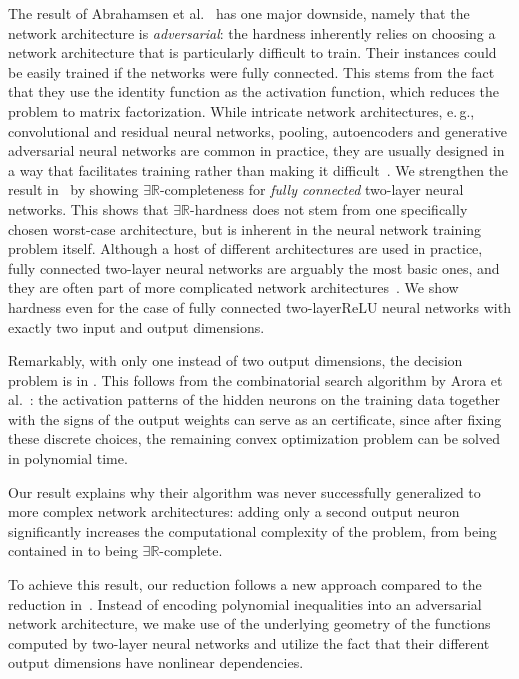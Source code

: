 \documentclass[11pt]{article}
\numberwithin{equation}{section}
\theoremstyle{definition}
\theoremstyle{plain}
\newcommand{\R}{\mathbb R}
\newcommand{\eg}{e.\,g.}
\newcommand{\ER}{\texorpdfstring{\ensuremath{\exists\R}}{ER}\xspace}
\newcommand{\fullyconnected}{fully connected\xspace}
\newcommand{\twolayer}{two-layer\xspace}
\newcommand{\ReLU}{\ensuremath{\mathrm{ReLU}}\xspace}
\theoremstyle{plain}
\begin{document}
The result of Abrahamsen et al.~\cite{Abrahamsen2021_NeuralNetworks} has one major
downside, namely that the network architecture is \emph{adversarial}:
%
the  %
hardness inherently relies on choosing a network architecture that is particularly
difficult to train.
Their instances could be easily trained if the networks were \fullyconnected.
This stems from the fact that they use the identity function as the activation function,
which reduces the problem to matrix factorization.
While intricate network architectures, \eg, convolutional and residual neural networks, pooling, autoencoders and generative adversarial neural networks are common in practice, they are usually designed in a way that facilitates training rather than making it difficult~\cite{Goodfellow2016_DeepLearning}.
We strengthen the result in~\cite{Abrahamsen2021_NeuralNetworks} by showing \ER-completeness for \emph{\fullyconnected} \twolayer neural networks.
This shows that \ER-hardness does not stem from one specifically chosen worst-case architecture, but is inherent in the neural network training problem itself.
Although a host of different architectures are used in practice, \fullyconnected \twolayer neural networks are arguably the most basic ones, and they are often part of more complicated network architectures~\cite{Goodfellow2016_DeepLearning}.
We show hardness even for the case of \fullyconnected \twolayer \ReLU neural networks with exactly two input and output dimensions.

Remarkably, with only one instead of two output dimensions, the
%
decision
%
problem is in \NP.
%
%
%
%
%
This follows from the combinatorial search algorithm by Arora et al.~\cite{Arora2018_Understanding}: the activation patterns of the hidden neurons on the training data together with the signs of the output weights can serve as an \NP{} certificate, since after fixing these discrete choices, the remaining convex optimization problem can be solved in polynomial time.
%

%
Our result explains why their algorithm was never successfully generalized to more complex network
architectures: adding only a second output neuron significantly increases the computational
complexity of the problem, from being contained in \NP{} to being \ER-complete.

To achieve this result, our reduction follows a %
%
%
%
new  %
approach compared to the reduction in~\cite{Abrahamsen2021_NeuralNetworks}.
%
%
Instead of encoding polynomial inequalities into an adversarial network architecture, we make use of the underlying geometry of the functions computed by \twolayer neural networks and utilize the fact that their different output dimensions have nonlinear dependencies.
\end{document}
